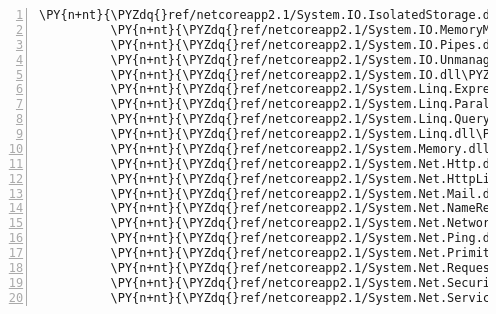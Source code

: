 \begin{Verbatim}[commandchars=\\\{\},numbers=left,firstnumber=1,stepnumber=1,numberblanklines=0]
          \PY{n+nt}{\PYZdq{}ref/netcoreapp2.1/System.IO.IsolatedStorage.dll\PYZdq{}}\PY{p}{:} \PY{p}{\PYZob{}}\PY{p}{\PYZcb{}}\PY{p}{,}
          \PY{n+nt}{\PYZdq{}ref/netcoreapp2.1/System.IO.MemoryMappedFiles.dll\PYZdq{}}\PY{p}{:} \PY{p}{\PYZob{}}\PY{p}{\PYZcb{}}\PY{p}{,}
          \PY{n+nt}{\PYZdq{}ref/netcoreapp2.1/System.IO.Pipes.dll\PYZdq{}}\PY{p}{:} \PY{p}{\PYZob{}}\PY{p}{\PYZcb{}}\PY{p}{,}
          \PY{n+nt}{\PYZdq{}ref/netcoreapp2.1/System.IO.UnmanagedMemoryStream.dll\PYZdq{}}\PY{p}{:} \PY{p}{\PYZob{}}\PY{p}{\PYZcb{}}\PY{p}{,}
          \PY{n+nt}{\PYZdq{}ref/netcoreapp2.1/System.IO.dll\PYZdq{}}\PY{p}{:} \PY{p}{\PYZob{}}\PY{p}{\PYZcb{}}\PY{p}{,}
          \PY{n+nt}{\PYZdq{}ref/netcoreapp2.1/System.Linq.Expressions.dll\PYZdq{}}\PY{p}{:} \PY{p}{\PYZob{}}\PY{p}{\PYZcb{}}\PY{p}{,}
          \PY{n+nt}{\PYZdq{}ref/netcoreapp2.1/System.Linq.Parallel.dll\PYZdq{}}\PY{p}{:} \PY{p}{\PYZob{}}\PY{p}{\PYZcb{}}\PY{p}{,}
          \PY{n+nt}{\PYZdq{}ref/netcoreapp2.1/System.Linq.Queryable.dll\PYZdq{}}\PY{p}{:} \PY{p}{\PYZob{}}\PY{p}{\PYZcb{}}\PY{p}{,}
          \PY{n+nt}{\PYZdq{}ref/netcoreapp2.1/System.Linq.dll\PYZdq{}}\PY{p}{:} \PY{p}{\PYZob{}}\PY{p}{\PYZcb{}}\PY{p}{,}
          \PY{n+nt}{\PYZdq{}ref/netcoreapp2.1/System.Memory.dll\PYZdq{}}\PY{p}{:} \PY{p}{\PYZob{}}\PY{p}{\PYZcb{}}\PY{p}{,}
          \PY{n+nt}{\PYZdq{}ref/netcoreapp2.1/System.Net.Http.dll\PYZdq{}}\PY{p}{:} \PY{p}{\PYZob{}}\PY{p}{\PYZcb{}}\PY{p}{,}
          \PY{n+nt}{\PYZdq{}ref/netcoreapp2.1/System.Net.HttpListener.dll\PYZdq{}}\PY{p}{:} \PY{p}{\PYZob{}}\PY{p}{\PYZcb{}}\PY{p}{,}
          \PY{n+nt}{\PYZdq{}ref/netcoreapp2.1/System.Net.Mail.dll\PYZdq{}}\PY{p}{:} \PY{p}{\PYZob{}}\PY{p}{\PYZcb{}}\PY{p}{,}
          \PY{n+nt}{\PYZdq{}ref/netcoreapp2.1/System.Net.NameResolution.dll\PYZdq{}}\PY{p}{:} \PY{p}{\PYZob{}}\PY{p}{\PYZcb{}}\PY{p}{,}
          \PY{n+nt}{\PYZdq{}ref/netcoreapp2.1/System.Net.NetworkInformation.dll\PYZdq{}}\PY{p}{:} \PY{p}{\PYZob{}}\PY{p}{\PYZcb{}}\PY{p}{,}
          \PY{n+nt}{\PYZdq{}ref/netcoreapp2.1/System.Net.Ping.dll\PYZdq{}}\PY{p}{:} \PY{p}{\PYZob{}}\PY{p}{\PYZcb{}}\PY{p}{,}
          \PY{n+nt}{\PYZdq{}ref/netcoreapp2.1/System.Net.Primitives.dll\PYZdq{}}\PY{p}{:} \PY{p}{\PYZob{}}\PY{p}{\PYZcb{}}\PY{p}{,}
          \PY{n+nt}{\PYZdq{}ref/netcoreapp2.1/System.Net.Requests.dll\PYZdq{}}\PY{p}{:} \PY{p}{\PYZob{}}\PY{p}{\PYZcb{}}\PY{p}{,}
          \PY{n+nt}{\PYZdq{}ref/netcoreapp2.1/System.Net.Security.dll\PYZdq{}}\PY{p}{:} \PY{p}{\PYZob{}}\PY{p}{\PYZcb{}}\PY{p}{,}
          \PY{n+nt}{\PYZdq{}ref/netcoreapp2.1/System.Net.ServicePoint.dll\PYZdq{}}\PY{p}{:} \PY{p}{\PYZob{}}\PY{p}{\PYZcb{}}\PY{p}{,}

\end{Verbatim}
